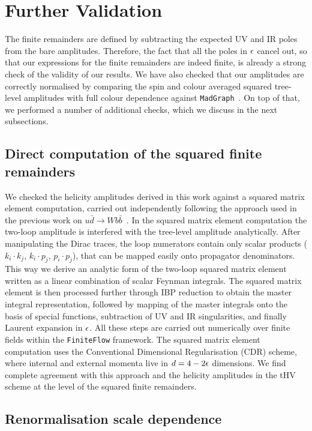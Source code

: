 \documentclass[main.tex]{subfiles}
\begin{document}
\section{Further Validation}
\label{Hbbsec:validation}

The finite remainders are defined by subtracting the expected UV and IR poles from the bare amplitudes. Therefore, the fact that all the poles in $\epsilon$ cancel out, so that our expressions for the finite remainders are indeed finite, is already a strong check of the validity of our results. We have also checked that our amplitudes are correctly normalised by comparing the spin and colour averaged squared tree-level amplitudes with full colour dependence against \texttt{MadGraph}~\cite{Alwall:2014hca}.
On top of that, we performed a number of additional checks, which we discuss in the next subsections.


\subsection{Direct computation of the squared finite remainders} 

We checked the helicity amplitudes derived in this work against a squared matrix element computation, carried out independently following the approach used in the previous work on $u\bar{d}\to Wb\bar{b}$~\cite{Badger:2021nhg}.
In the squared matrix element computation the two-loop amplitude is interfered with the tree-level amplitude analytically. After manipulating the
Dirac traces, the loop numerators contain only scalar products ($k_i \cdot k_j$, $k_i \cdot p_j$, $p_i \cdot p_j$), that can be mapped easily onto propagator denominators. This way we derive an analytic form of the two-loop squared matrix element written as a linear combination of scalar Feynman integrals. The squared matrix element is then processed further through IBP reduction to obtain the master integral representation, followed by mapping of the master integrals onto the basis of special functions, subtraction of UV and IR singularities, and finally Laurent expansion in $\epsilon$. 
All these steps are carried out numerically over finite fields within the \texttt{FiniteFlow} framework. 
The squared matrix element computation uses the Conventional Dimensional Regularisation (CDR) scheme, where internal and external momenta live in $d=4-2 \epsilon$ dimensions. We find complete agreement with this approach and the helicity amplitudes in the tHV scheme at the level of the squared finite remainders.


\subsection{Renormalisation scale dependence} \label{Hbbsec:renormscaledep}
\end{document}
